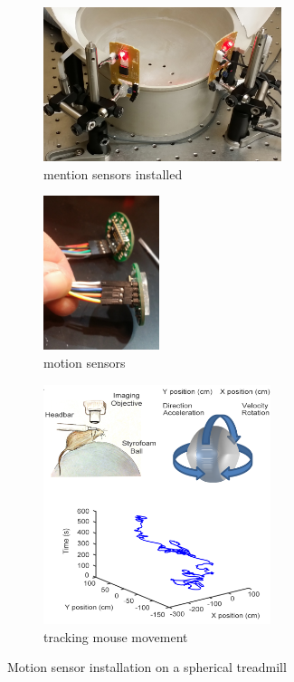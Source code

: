 \begin{figure}[htb]
	\begin{subfigure}[t]{0.45\linewidth}\centering
		\includegraphics[height=4.5cm]{figures/01-motion-sensors-installed.jpg}
        \caption{mention sensors installed}
	\end{subfigure}
	\hfill
	\begin{subfigure}[t]{0.45\linewidth}\centering
		\includegraphics[height=4.5cm]{figures/02-motion-sensors.jpg}
        \caption{motion sensors}
	\end{subfigure}
	\begin{subfigure}[t]{\linewidth}\centering
		\includegraphics[height=7cm]{figures/striatum_figure2.png}
        \caption{tracking mouse movement}
	\end{subfigure}
	\caption{Motion sensor installation on a spherical treadmill}
	\label{fig:motion-sensors-on-spherical-treadmill}
\end{figure}

